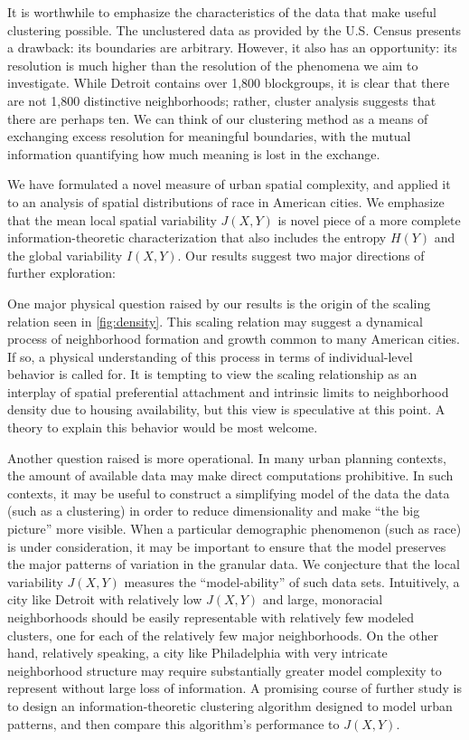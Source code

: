 It is worthwhile to emphasize the characteristics of the data that make useful clustering possible. The unclustered data as provided by the U.S. Census presents a drawback: its boundaries are arbitrary. However, it also has an opportunity: its resolution is much higher than the resolution of the phenomena we aim to investigate. While Detroit contains over 1,800 blockgroups, it is clear that there are not 1,800 distinctive neighborhoods; rather, cluster analysis suggests that there are perhaps ten. We can think of our clustering method as a means of exchanging excess resolution for meaningful boundaries, with the mutual information quantifying how much meaning is lost in the exchange. 

We have formulated a novel measure of urban spatial complexity, and applied it to an analysis of spatial distributions of race in American cities. We emphasize that the mean local spatial variability $J(X,Y)$ is novel piece of a more complete information-theoretic characterization that also includes the entropy $H(Y)$ and the global variability $I(X,Y)$. Our results suggest two major directions of further exploration: 

One major physical question raised by our results is the origin of the scaling relation seen in \ref{fig:density}. This scaling relation may suggest a dynamical process of neighborhood formation and growth common to many American cities. If so, a physical understanding of this process in terms of individual-level behavior is called for. It is tempting to view the scaling relationship as an interplay of spatial preferential attachment and intrinsic limits to neighborhood density due to housing availability, but this view is speculative at this point. A theory to explain this behavior would be most welcome. 

Another question raised is more operational. In many urban planning contexts, the amount of available data may make direct computations prohibitive. In such contexts, it may be useful to construct a simplifying model of the data the data (such as a clustering) in order to reduce dimensionality and make ``the big picture'' more visible. When a particular demographic phenomenon (such as race) is under consideration, it may be important to ensure that the model preserves the major patterns of variation in the granular data. We conjecture that the local variability $J(X,Y)$ measures the ``model-ability'' of such data sets. Intuitively, a city like Detroit with relatively low $J(X,Y)$ and large, monoracial neighborhoods should be easily representable with relatively few modeled clusters, one for each of the relatively few major neighborhoods. On the other hand, relatively speaking, a city like Philadelphia with very intricate neighborhood structure may require substantially greater model complexity to represent without large loss of information. A promising course of further study is to design an information-theoretic clustering algorithm designed to model urban patterns, and then compare this algorithm's performance to $J(X,Y)$. 

